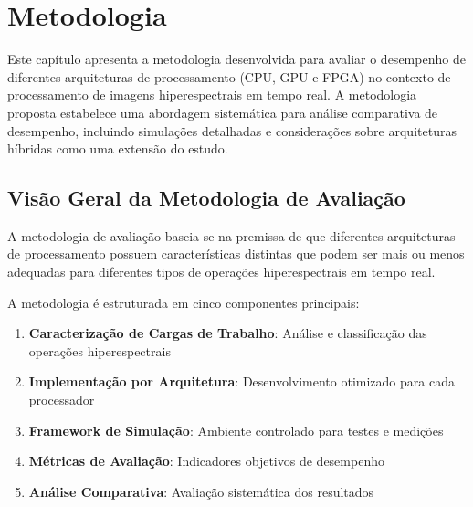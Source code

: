 \chapter{Metodologia}\label{chp:metodologia}

Este capítulo apresenta a metodologia desenvolvida para avaliar o desempenho de diferentes arquiteturas de processamento (CPU, GPU e FPGA) no contexto de processamento de imagens hiperespectrais em tempo real. A metodologia proposta estabelece uma abordagem sistemática para análise comparativa de desempenho, incluindo simulações detalhadas e considerações sobre arquiteturas híbridas como uma extensão do estudo.

\section{Visão Geral da Metodologia de Avaliação}\label{sec:visao_geral}

A metodologia de avaliação baseia-se na premissa de que diferentes arquiteturas de processamento possuem características distintas que podem ser mais ou menos adequadas para diferentes tipos de operações hiperespectrais em tempo real.


A metodologia é estruturada em cinco componentes principais:

\begin{enumerate}
    \item \textbf{Caracterização de Cargas de Trabalho}: Análise e classificação das operações hiperespectrais
    \item \textbf{Implementação por Arquitetura}: Desenvolvimento otimizado para cada processador
    \item \textbf{Framework de Simulação}: Ambiente controlado para testes e medições
    \item \textbf{Métricas de Avaliação}: Indicadores objetivos de desempenho
    \item \textbf{Análise Comparativa}: Avaliação sistemática dos resultados
\end{enumerate}

